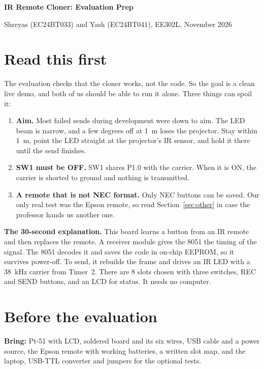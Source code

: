 \documentclass[11pt,a4paper]{article}
\begin{document}
{\LARGE\sffamily\bfseries\color{accent} IR Remote Cloner: Evaluation Prep\par}
\vspace{2pt}
{\small Shreyas (EC24BT033) and Yash (EC24BT041), EE302L, November 2026\par}
\vspace{6pt}

\section{Read this first}

The evaluation checks that the cloner works, not the code. So the goal is a clean live demo, and both of us should be able to run it alone. Three things can spoil it:

\begin{enumerate}
\item \textbf{Aim.} Most failed sends during development were down to aim. The LED beam is narrow, and a few degrees off at \qty{1}{\metre} loses the projector. Stay within \qty{1}{\metre}, point the LED straight at the projector's IR sensor, and hold it there until the send finishes.
\item \textbf{SW1 must be OFF.} SW1 shares P1.0 with the carrier. When it is ON, the carrier is shorted to ground and nothing is transmitted.
\item \textbf{A remote that is not NEC format.} Only NEC buttons can be saved. Our only real test was the Epson remote, so read Section~\ref{sec:other} in case the professor hands us another one.
\end{enumerate}

\colorbox{note}{\parbox{\dimexpr\linewidth-2\fboxsep}{\textbf{The 30-second explanation.} This board learns a button from an IR remote and then replaces the remote. A receiver module gives the 8051 the timing of the signal. The 8051 decodes it and saves the code in on-chip EEPROM, so it survives power-off. To send, it rebuilds the frame and drives an IR LED with a \qty{38}{\kilo\hertz} carrier from Timer~2. There are 8 slots chosen with three switches, REC and SEND buttons, and an LCD for status. It needs no computer.}}

\section{Before the evaluation}

\textbf{Bring:} Pt-51 with LCD, soldered board and its six wires, USB cable and a power source, the Epson remote with working batteries, a written slot map, and the laptop, USB-TTL converter and jumpers for the optional tests.
\end{document}

